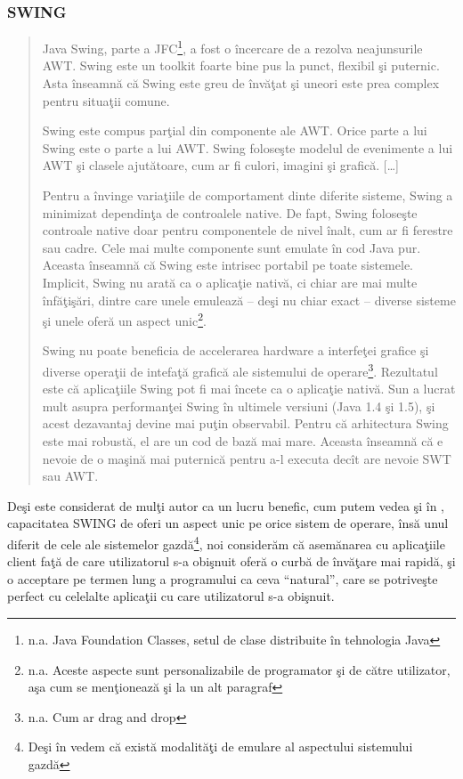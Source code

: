\subsubsection{SWING}

\begin{quotation}
Java Swing, parte a JFC\footnote{n.a. Java Foundation Classes, setul de clase
distribuite în tehnologia Java}, a fost o încercare de a rezolva neajunsurile
AWT. Swing este un toolkit foarte bine pus la punct, flexibil şi puternic. Asta
înseamnă că Swing este greu de învăţat şi uneori este prea complex pentru
situaţii comune.

Swing este compus parţial din componente ale AWT. Orice parte a lui Swing este o
parte a lui AWT. Swing foloseşte modelul de evenimente a lui AWT şi clasele
ajutătoare, cum ar fi culori, imagini şi grafică. [\ldots]

Pentru a învinge variaţiile de comportament dinte diferite sisteme, Swing a 
minimizat dependinţa de controalele native. De fapt, Swing foloseşte controale 
native doar pentru componentele de nivel înalt, cum ar fi ferestre sau cadre. 
Cele mai multe componente sunt emulate în cod Java pur. Aceasta înseamnă că 
Swing este intrisec portabil pe toate sistemele. Implicit, Swing nu arată ca o 
aplicaţie nativă, ci chiar are mai multe înfăţişări, dintre care unele emulează 
-- deşi nu chiar exact -- diverse sisteme şi unele oferă un aspect 
unic\footnote{n.a. Aceste aspecte sunt personalizabile de programator şi de 
către utilizator, aşa cum se menţionează şi \cite{swtawtswing} la un alt 
paragraf}.

Swing nu poate beneficia de accelerarea hardware a interfeţei grafice şi diverse
operaţii de intefaţă grafică ale sistemului de operare\footnote{n.a. Cum ar
drag and drop}. Rezultatul este că aplicaţiile Swing pot fi mai încete ca o
aplicaţie nativă. Sun a lucrat mult asupra performanţei Swing în ultimele
versiuni (Java 1.4 şi 1.5), şi acest dezavantaj devine mai puţin observabil.
Pentru că arhitectura Swing este mai robustă, el are un cod de bază mai mare.
Aceasta înseamnă că e nevoie de o maşină mai puternică pentru a-l executa decît
are nevoie SWT sau AWT.
\cite{swtawtswing}
\end{quotation}

Deşi este considerat de mulţi autor ca un lucru benefic, cum putem vedea şi în
\cite{killswt}, capacitatea SWING de oferi un aspect unic pe orice sistem de
operare, însă unul diferit de cele ale sistemelor gazdă\footnote{Deşi în
\cite{killswt} vedem că există modalităţi de emulare al aspectului sistemului
gazdă}, noi considerăm că asemănarea cu aplicaţiile client faţă de care
utilizatorul s-a obişnuit oferă o curbă de învăţare mai rapidă, şi o acceptare
pe termen lung a programului ca ceva ``natural'', care se potriveşte perfect cu
celelalte aplicaţii cu care utilizatorul s-a obişnuit.

